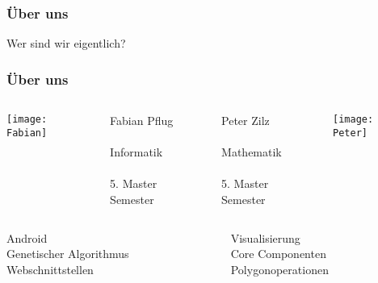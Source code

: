 
\begin{frame}
    \frametitle{Über uns}
    \begin{center}
    \huge{Wer sind wir eigentlich?}
    \end{center}
\end{frame}

\begin{frame}
    \frametitle{Über uns}
	\begin{columns}
		\begin{column}{0.25\textwidth}
			\texttt{[image: Fabian]}
		\end{column}
		\begin{column}{0.25\textwidth}
		\begin{flushleft}
			Fabian Pflug\\
\quad\\
			Informatik\\
\quad\\
			5. Master Semester\\
		\end{flushleft}
		\end{column}
		\begin{column}{0.25\textwidth}
		\begin{flushright}
			Peter Zilz\\
\quad\\
			Mathematik\\
\quad\\
			5. Master Semester\\
		\end{flushright}
		\end{column}
		\begin{column}{0.25\textwidth}
			\texttt{[image: Peter]}
		\end{column}
	\end{columns}
  \begin{columns}
  \begin{column}{0.5\textwidth}
    \begin{flushleft}
        Android\\
        Genetischer Algorithmus\\
        Webschnittstellen\\
    \end{flushleft}
  \end{column}
  \begin{column}{0.5\textwidth}
    \begin{flushright}
        Visualisierung\\
        Core Componenten\\
        Polygonoperationen
    \end{flushright}
  \end{column}
  \end{columns}
\end{frame}
